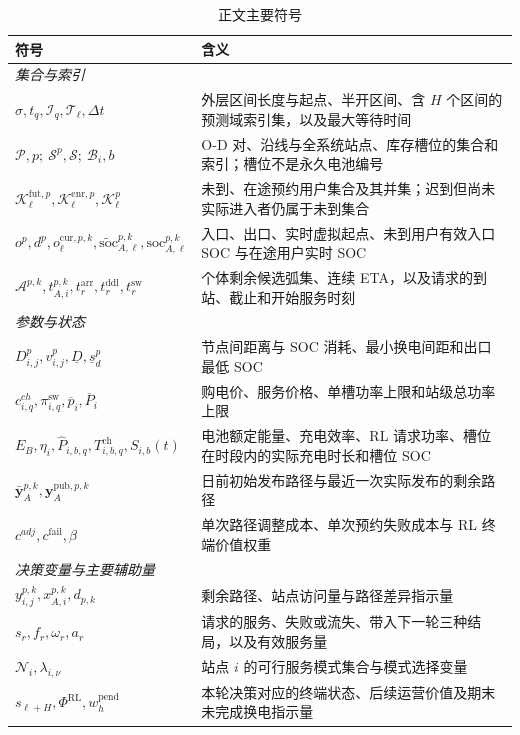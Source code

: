 \documentclass[12pt,a4paper,UTF8]{ctexart}
\begin{document}
\begin{table}[!htbp]
  \centering
  \caption{正文主要符号}
  \label{tab:notation}
  \small
  \setlength{\tabcolsep}{3pt}
  \renewcommand{\arraystretch}{0.98}
  \begin{tabular}{@{}lp{11cm}@{}}
    \toprule
    \textbf{符号} & \textbf{含义} \\
    \midrule
    \multicolumn{2}{l}{\textit{集合与索引}} \\
    $\sigma,t_q,\mathcal I_q,\mathcal T_\ell,\Delta t$ & 外层区间长度与起点、半开区间、含 $H$ 个区间的预测域索引集，以及最大等待时间 \\
    $\mathcal P,p;\ \mathcal S^p,\mathcal S;\ \mathcal B_i,b$ & O-D 对、沿线与全系统站点、库存槽位的集合和索引；槽位不是永久电池编号 \\
    $\mathcal K_\ell^{\mathrm{fut},p},\mathcal K_\ell^{\mathrm{enr},p},\mathcal K_\ell^p$ & 未到、在途预约用户集合及其并集；迟到但尚未实际进入者仍属于未到集合 \\
    $o^p,d^p,o_\ell^{\mathrm{cur},p,k},\widetilde{\mathrm{soc}}_{A,\ell}^{p,k},\mathrm{soc}_{A,\ell}^{p,k}$ & 入口、出口、实时虚拟起点、未到用户有效入口 SOC 与在途用户实时 SOC \\
    $\mathcal A^{p,k},t_{A,i}^{p,k},t_r^{\mathrm{arr}},t_r^{\mathrm{ddl}},t_r^{\mathrm{sw}}$ & 个体剩余候选弧集、连续 ETA，以及请求的到站、截止和开始服务时刻 \\
    \midrule
    \multicolumn{2}{l}{\textit{参数与状态}} \\
    $D_{i,j}^{p},v_{i,j}^{p},\underline D,\underline s_d^p$ & 节点间距离与 SOC 消耗、最小换电间距和出口最低 SOC \\
    $c^{ch}_{i,q},\pi_{i,q}^{\mathrm{sw}},\overline p_i,\overline P_i$ & 购电价、服务价格、单槽功率上限和站级总功率上限 \\
    $E_B,\eta_i,\widehat P_{i,b,q},T_{i,b,q}^{\mathrm{ch}},S_{i,b}(t)$ & 电池额定能量、充电效率、RL 请求功率、槽位在时段内的实际充电时长和槽位 SOC \\
    $\bar{\mathbf y}_{A}^{p,k},\mathbf y_{A}^{\mathrm{pub},p,k}$ & 日前初始发布路径与最近一次实际发布的剩余路径 \\
    $c^{adj},c^{\mathrm{fail}},\beta$ & 单次路径调整成本、单次预约失败成本与 RL 终端价值权重 \\
    \midrule
    \multicolumn{2}{l}{\textit{决策变量与主要辅助量}} \\
    $y_{i,j}^{p,k},x_{A,i}^{p,k},d_{p,k}$ & 剩余路径、站点访问量与路径差异指示量 \\
    $s_r,f_r,\omega_r,a_r$ & 请求的服务、失败或流失、带入下一轮三种结局，以及有效服务量 \\
    $\mathcal N_i,\lambda_{i,\nu}$ & 站点 $i$ 的可行服务模式集合与模式选择变量 \\
    $s_{\ell+H},\Phi^{\mathrm{RL}},w_h^{\mathrm{pend}}$ & 本轮决策对应的终端状态、后续运营价值及期末未完成换电指示量 \\
    \bottomrule
  \end{tabular}
\end{table}
\end{document}
